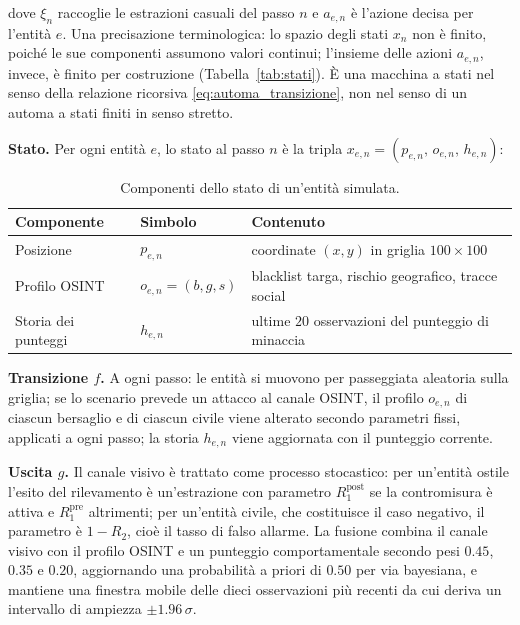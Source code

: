 dove $\xi_n$ raccoglie le estrazioni casuali del passo $n$ e $a_{e,n}$ è
l'azione decisa per l'entità $e$. Una precisazione terminologica: lo spazio
degli stati $x_n$ non è finito, poiché le sue componenti assumono valori
continui; l'insieme delle azioni $a_{e,n}$, invece, è finito per costruzione
(Tabella~\ref{tab:stati}). È una macchina a stati nel senso della relazione
ricorsiva \eqref{eq:automa_transizione}, non nel senso di un automa a stati
finiti in senso stretto.

\textbf{Stato.} Per ogni entità $e$, lo stato al passo $n$ è la tripla
$x_{e,n} = (p_{e,n},\, o_{e,n},\, h_{e,n})$:

\begin{table}[htbp]
\centering
\begin{tabular}{lll}
\toprule
\textbf{Componente} & \textbf{Simbolo} & \textbf{Contenuto} \\
\midrule
Posizione & $p_{e,n}$ & coordinate $(x,y)$ in griglia $100\times100$ \\
Profilo OSINT & $o_{e,n} = (b,g,s)$ & blacklist targa, rischio geografico, tracce social \\
Storia dei punteggi & $h_{e,n}$ & ultime $20$ osservazioni del punteggio di minaccia \\
\bottomrule
\end{tabular}
\caption{Componenti dello stato di un'entità simulata.}
\label{tab:stato}
\end{table}

\textbf{Transizione $f$.} A ogni passo: le entità si muovono per passeggiata
aleatoria sulla griglia; se lo scenario prevede un attacco al canale OSINT, il
profilo $o_{e,n}$ di ciascun bersaglio e di ciascun civile viene alterato
secondo parametri fissi, applicati a ogni passo; la storia $h_{e,n}$ viene
aggiornata con il punteggio corrente.

\textbf{Uscita $g$.} Il canale visivo è trattato come processo stocastico: per
un'entità ostile l'esito del rilevamento è un'estrazione con parametro
$R_1^{\text{post}}$ se la contromisura è attiva e $R_1^{\text{pre}}$
altrimenti; per un'entità civile, che costituisce il caso negativo, il
parametro è $1 - R_2$, cioè il tasso di falso allarme. La fusione combina il
canale visivo con il profilo OSINT e un punteggio comportamentale secondo pesi
$0.45$, $0.35$ e $0.20$, aggiornando una probabilità a priori di $0.50$ per via
bayesiana, e mantiene una finestra mobile delle dieci osservazioni più recenti
da cui deriva un intervallo di ampiezza $\pm 1.96\,\sigma$.

